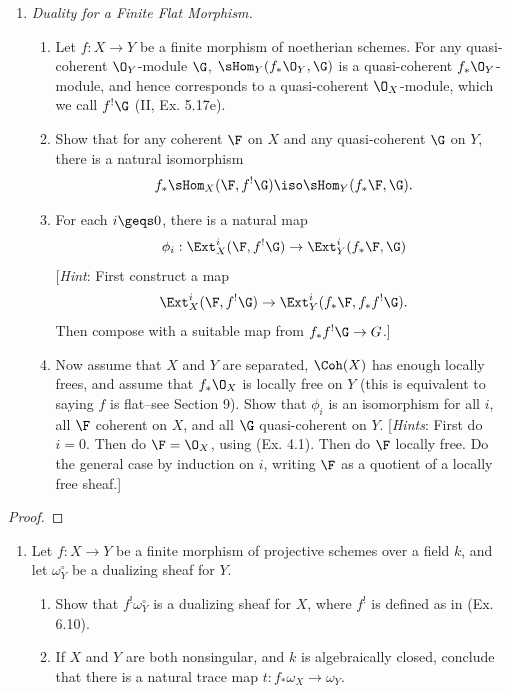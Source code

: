 \documentclass[12pt]{amsart}
\begin{document}
\begin{enumerate}
  \item[6.10.] {
      \emph{Duality for a Finite Flat Morphism.}
      \begin{enumerate}
        \item Let $f:X\to Y$ be a finite morphism of noetherian schemes.
          For any quasi-coherent $\O_Y$-module $\G$, $\sHom_Y(f_*\O_Y,\G)$ is a quasi-coherent $f_*\O_Y$-module, and hence corresponds to a quasi-coherent $\O_X$-module, which we call $f^!\G$ (II, Ex. 5.17e).
        \item Show that for any coherent $\F$ on $X$ and any quasi-coherent $\G$ on $Y$, there is a natural isomorphism
          \[
            f_*\sHom_X(\F,f^!\G)\iso \sHom_Y(f_*\F,\G).
          \] 
        \item For each $i\geqs 0$, there is a natural map
          \[
            \phi_i:\Ext^i_X(\F,f^!\G)\to \Ext^i_Y(f_*\F,\G)
          \] 
          [\emph{Hint}: First construct a map
          \[
            \Ext^i_X(\F,f^!\G)\to \Ext^i_Y(f_*\F,f_*f^!\G).
          \] 
          Then compose with a suitable map from $f_*f^!\G\to G$.]
        \item Now assume that $X$ and $Y$ are separated, $\Coh(X)$ has enough locally frees, and assume that $f_*\O_X$ is locally free on $Y$ (this is equivalent to saying $f$ is flat--see Section 9).
        Show that $\phi_i$ is an isomorphism for all $i$, all $\F$ coherent on $X$, and all $\G$ quasi-coherent on $Y$.
        [\emph{Hints}: First do $i=0$.
        Then do $\F=\O_X$, using (Ex. 4.1).
        Then do $\F$ locally free.
        Do the general case by induction on $i$, writing $\F$ as a quotient of a locally free sheaf.]
      \end{enumerate}
    }
\end{enumerate}

\begin{proof}
\end{proof}

\begin{enumerate}
  \item[7.2.] {
      Let $f:X\to Y$ be a finite morphism of projective schemes over a field $k$, and let $\omega_Y^\circ$ be a dualizing sheaf for $Y$.
      \begin{enumerate}
        \item Show that $f^!\omega_Y^\circ$ is a dualizing sheaf for $X$, where $f^!$ is defined as in (Ex. 6.10).
        \item If $X$ and $Y$ are both nonsingular, and $k$ is algebraically closed, conclude that there is a natural trace map $t:f_*\omega_X\to \omega_Y$.
      \end{enumerate}
    }
\end{enumerate}
\end{document}
